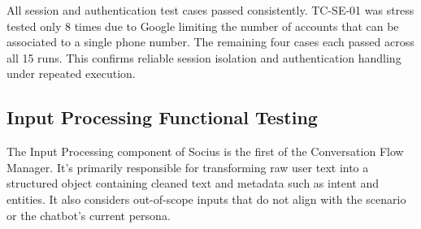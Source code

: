 \noindent All session and authentication test cases passed consistently. TC-SE-01 was stress tested only 8 times due to Google limiting the number of accounts that can be associated to a single phone number.
 The remaining four cases each passed across all 15 runs. This confirms reliable session isolation and authentication handling under repeated execution.
 
\subsection{Input Processing Functional Testing}
 
  The Input Processing component of Socius is the first of the Conversation Flow Manager. It's primarily responsible for transforming raw user text into a structured object
  containing cleaned text and metadata such as intent and entities. It also considers out-of-scope inputs that do not align with the scenario or the chatbot's current persona.
 
